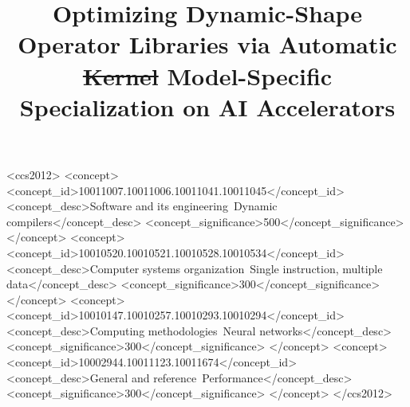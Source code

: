 \documentclass[manuscript,screen,review]{acmart}
\theoremstyle{indenteditalic}
\providecommand{\DIFaddtex}[1]{{\protect\color{blue}#1}} %
\providecommand{\DIFidentity}[1]{#1}
\providecommand{\DIFdeltex}[1]{{%
  \protect\color{red}%
  \normalfont\normalsize
  \let\textbf\DIFidentity
  \let\textit\DIFidentity
  \let\texttt\DIFidentity
  \let\textsc\DIFidentity
  \let\textsf\DIFidentity
  \let\emph\DIFidentity
  \let\uline\DIFidentity
  \sout{#1}%
}} %
\providecommand{\DIFaddbegin}{} %
\providecommand{\DIFaddend}{} %
\providecommand{\DIFdelbegin}{} %
\providecommand{\DIFdelend}{} %
\providecommand{\DIFadd}[1]{\texorpdfstring{\DIFaddtex{#1}}{#1}} %
\providecommand{\DIFdel}[1]{\texorpdfstring{\DIFdeltex{#1}}{}} %
\begin{document}
\title{Optimizing Dynamic-Shape Operator Libraries via Automatic \DIFdelbegin \DIFdel{Kernel }\DIFdelend \DIFaddbegin \DIFadd{Model-Specific }\DIFaddend Specialization on AI Accelerators}







\begin{CCSXML}
	<ccs2012>
	<concept>
		<concept_id>10011007.10011006.10011041.10011045</concept_id>
		<concept_desc>Software and its engineering~Dynamic compilers</concept_desc>
		<concept_significance>500</concept_significance>
		</concept>
	<concept>
		<concept_id>10010520.10010521.10010528.10010534</concept_id>
		<concept_desc>Computer systems organization~Single instruction, multiple data</concept_desc>
		<concept_significance>300</concept_significance>
		</concept>
	<concept>
		<concept_id>10010147.10010257.10010293.10010294</concept_id>
		<concept_desc>Computing methodologies~Neural networks</concept_desc>
		<concept_significance>300</concept_significance>
		</concept>
	<concept>
		<concept_id>10002944.10011123.10011674</concept_id>
		<concept_desc>General and reference~Performance</concept_desc>
		<concept_significance>300</concept_significance>
		</concept>
	</ccs2012>
\end{CCSXML}
\end{document}
